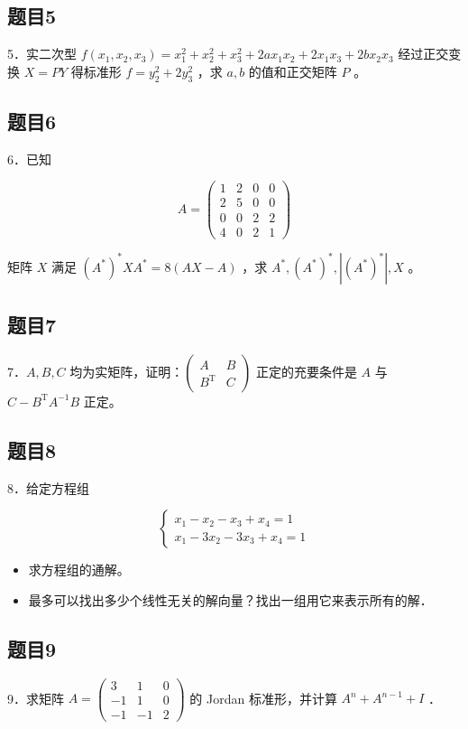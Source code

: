 \documentclass{article}
\begin{document}
\subsection{题目5}
5．实二次型 \(f\left(x_{1}, x_{2}, x_{3}\right)=x_{1}^{2}+x_{2}^{2}+x_{3}^{2}+2 a x_{1} x_{2}+2 x_{1} x_{3}+2 b x_{2} x_{3}\) 经过正交变换 \(X=P Y\) 得标准形 \(f=y_{2}^{2}+2 y_{3}^{2}\) ，求 \(a, b\) 的值和正交矩阵 \(P\) 。

\subsection{题目6}
6．已知

\[
A=\left(\begin{array}{llll}
1 & 2 & 0 & 0 \\
2 & 5 & 0 & 0 \\
0 & 0 & 2 & 2 \\
4 & 0 & 2 & 1
\end{array}\right)
\]

矩阵 \(X\) 满足 \(\left(A^{*}\right)^{*} X A^{*}=8(A X-A)\) ，求 \(A^{*},\left(A^{*}\right)^{*},\left|\left(A^{*}\right)^{*}\right|, X\) 。

\subsection{题目7}
7．\(A, B, C\) 均为实矩阵，证明：\(\left(\begin{array}{cc}A & B \\ B^{\mathrm{T}} & C\end{array}\right)\) 正定的充要条件是 \(A\) 与 \(C-B^{\mathrm{T}} A^{-1} B\) 正定。

\subsection{题目8}
8．给定方程组

\[
\left\{\begin{array}{l}
x_{1}-x_{2}-x_{3}+x_{4}=1 \\
x_{1}-3 x_{2}-3 x_{3}+x_{4}=1
\end{array}\right.
\]

\begin{itemize}
  \item[（1）] 求方程组的通解。
  \item[（2）] 最多可以找出多少个线性无关的解向量？找出一组用它来表示所有的解．
\end{itemize}

\subsection{题目9}
9．求矩阵 \(A=\left(\begin{array}{ccc}3 & 1 & 0 \\ -1 & 1 & 0 \\ -1 & -1 & 2\end{array}\right)\) 的 Jordan 标准形，并计算 \(A^{n}+A^{n-1}+I\) ．
\end{document}
